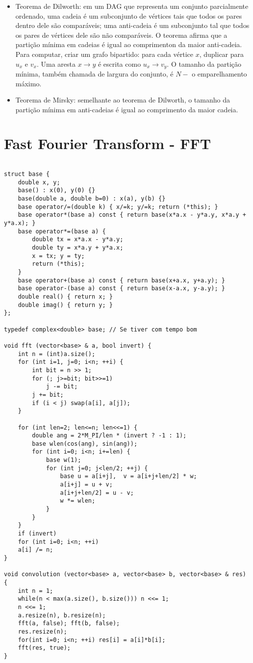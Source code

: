 \begin{itemize}
\item Teorema de Dilworth: em um DAG que representa um conjunto parcialmente ordenado, uma cadeia é um subconjunto de vértices tais que todos os pares dentro dele são comparáveis; uma anti-cadeia é um subconjunto tal que todos os pares de vértices dele são não comparáveis. O teorema afirma que a partição mínima em cadeias é igual ao comprimenton da maior anti-cadeia. Para computar, criar um grafo bipartido: para cada vértice $x$, duplicar para $u_x$ e $v_x$. Uma aresta $x \rightarrow y$ é escrita como $u_x \rightarrow v_y$. O tamanho da partição mínima, também chamada de largura do conjunto, é $N-$ o emparelhamento máximo.
\item Teorema de Mirsky: semelhante ao teorema de Dilworth, o tamanho da partição mínima em anti-cadeias é igual ao comprimento da maior cadeia.
\end{itemize}


\section{Fast Fourier Transform - FFT}

\begin{multicols}{2}
	\begin{lstlisting}

struct base {
	double x, y;
	base() : x(0), y(0) {}
	base(double a, double b=0) : x(a), y(b) {}
	base operator/=(double k) { x/=k; y/=k; return (*this); }
	base operator*(base a) const { return base(x*a.x - y*a.y, x*a.y + y*a.x); }
	base operator*=(base a) {
		double tx = x*a.x - y*a.y;
		double ty = x*a.y + y*a.x;
		x = tx; y = ty;
		return (*this);
	}
	base operator+(base a) const { return base(x+a.x, y+a.y); }
	base operator-(base a) const { return base(x-a.x, y-a.y); }
	double real() { return x; }
	double imag() { return y; }
};

typedef complex<double> base; // Se tiver com tempo bom

void fft (vector<base> & a, bool invert) {
	int n = (int)a.size();
	for (int i=1, j=0; i<n; ++i) {
		int bit = n >> 1;
		for (; j>=bit; bit>>=1)
			j -= bit;
		j += bit;
		if (i < j) swap(a[i], a[j]);
	}
	
	for (int len=2; len<=n; len<<=1) {
		double ang = 2*M_PI/len * (invert ? -1 : 1);
		base wlen(cos(ang), sin(ang));
		for (int i=0; i<n; i+=len) {
			base w(1);
			for (int j=0; j<len/2; ++j) {
				base u = a[i+j],  v = a[i+j+len/2] * w;
				a[i+j] = u + v;
				a[i+j+len/2] = u - v;
				w *= wlen;
			}
		}
	}
	if (invert)
	for (int i=0; i<n; ++i)
	a[i] /= n;
}

void convolution (vector<base> a, vector<base> b, vector<base> & res) {
	int n = 1;
	while(n < max(a.size(), b.size())) n <<= 1;
	n <<= 1;
	a.resize(n), b.resize(n);
	fft(a, false); fft(b, false);
	res.resize(n);
	for(int i=0; i<n; ++i) res[i] = a[i]*b[i];
	fft(res, true);
}

\end{lstlisting}
\end{multicols}

